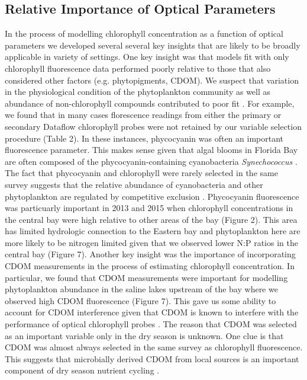 \subsection{Relative Importance of Optical Parameters}
\label{optical}

In the process of modelling chlorophyll concentration as a function of optical parameters we developed several several key insights that are likely to be broadly applicable in variety of settings. One key insight was that models fit with only chlorophyll fluorescence data performed poorly relative to those that also considered other factors (e.g. phytopigments, CDOM). We suspect that variation in the physiological condition of the phytoplankton community as well as abundance of non-chlorophyll compounds contributed to poor fit \citep{proctor2010new}. For example, we found that in many cases florescence readings from either the primary or secondary Dataflow chlorophyll probes were not retained by our variable selection procedure (Table 2). In these instances, phycocyanin was often an important fluorescence parameter. This makes sense given that algal blooms in Florida Bay are often composed of the phycocyanin-containing cyanobacteria \emph{Synechococcus} \citep{phlips_blooms_1999,shangguan2017phytoplankton}. The fact that phycocyanin and chlorophyll were rarely selected in the same survey suggests that the relative abundance of cyanobacteria and other phytoplankton are regulated by competitive exclusion \citep{passarge2006competition}. Phycocyanin fluorescence was particuarly important in 2013 and 2015 when chlorophyll concentrations in the central bay were high relative to other areas of the bay (Figure 2). This area has limited hydrologic connection \citep{lee2016circulation} to the Eastern bay and phytoplankton here are more likely to be nitrogen limited given that we observed lower N:P ratios in the central bay (Figure 7). Another key insight was the importance of incorporating CDOM measurements in the process of estimating chlorophyll concentration. In particular, we found that CDOM measurements were important for modelling phytoplankton abundance in the saline lakes upstream of the bay where we observed high CDOM fluorescence (Figure 7). This gave us some ability to account for CDOM interference given that CDOM is known to interfere with the performance of optical chlorophyll probes \citep{proctor2010new}. The reason that CDOM was selected as an important variable only in the dry season is unknown. One clue is that CDOM was almost always selected in the same survey as chlorophyll fluorescence. This suggests that microbially derived CDOM from local sources is an important component of dry season nutrient cycling \citep{boyer2006role,maie2012application,traving2017effect}.

